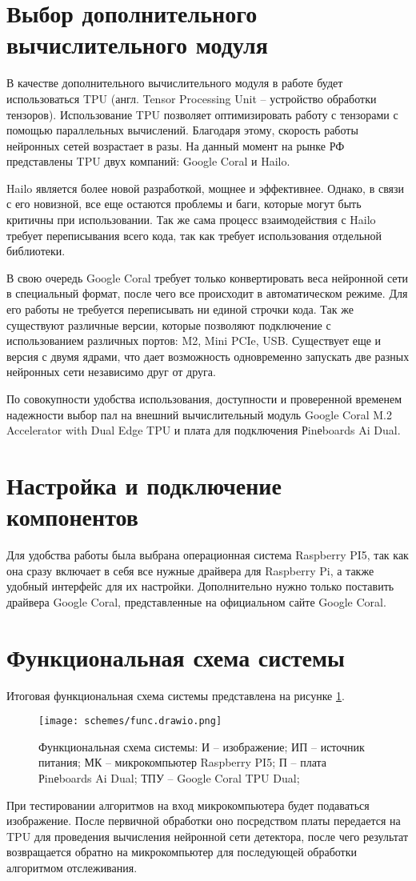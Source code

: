 \section{Выбор дополнительного вычислительного модуля}
В качестве дополнительного вычислительного модуля в работе будет использоваться TPU (англ. Tensor Processing Unit -- устройство обработки тензоров). Использование TPU позволяет оптимизировать работу с тензорами с помощью параллельных вычислений.
Благодаря этому, скорость работы нейронных сетей возрастает в разы. На данный момент на рынке РФ представлены TPU двух компаний: Google Coral и Hailo. 

Hailo является более новой разработкой, мощнее и эффективнее. Однако, в связи с его новизной, все еще остаются проблемы и баги, которые могут быть критичны при использовании. Так же сама процесс взаимодействия с Hailo требует переписывания всего кода, так как требует использования отдельной библиотеки. 

В свою очередь Google Coral требует только конвертировать веса нейронной сети в специальный формат, после чего все происходит в автоматическом режиме. Для его работы не требуется переписывать ни единой строчки кода. 
Так же существуют различные версии, которые позволяют подключение с использованием различных портов: M2, Mini PCIe, USB. 
Существует еще и версия с двумя ядрами, что дает возможность одновременно запускать две разных нейронных сети независимо друг от друга. 

По совокупности удобства использования, доступности и проверенной временем надежности выбор пал на внешний вычислительный модуль Google Coral M.2 Accelerator with Dual Edge TPU и плата для подключения Рinеboards Ai Dual. 

\section{Настройка и подключение компонентов}
Для удобства работы была выбрана операционная система Raspberry PI5, так как она сразу включает в себя все нужные драйвера для Raspberry Pi, а также удобный интерфейс для их настройки. 
Дополнительно нужно только поставить драйвера Google Coral, представленные на официальном сайте Google Coral. 

\section{Функциональная схема системы}

Итоговая функциональная схема системы представлена на рисунке \ref{fig:func_scheme}. 
\begin{figure}[ht]
  \centering
  \texttt{[image: schemes/func.drawio.png]}
  \caption{Функциональная схема системы: И -- изображение; ИП -- источник питания; МК -- микрокомпьютер Raspberry PI5; П -- плата Рinеboards Ai Dual; ТПУ -- Google Coral TPU Dual;}
  \label{fig:func_scheme}
\end{figure}
При тестировании алгоритмов на вход микрокомпьютера будет подаваться изображение. После первичной обработки оно посредством платы передается на TPU для проведения вычисления нейронной сети детектора, после чего результат возвращается обратно на микрокомпьютер для последующей обработки алгоритмом отслеживания.
